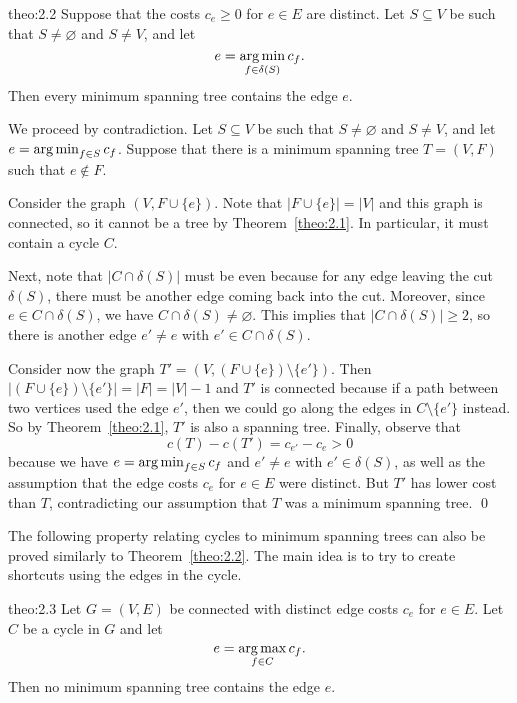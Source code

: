 \begin{theo}{theo:2.2}
    Suppose that the costs $c_e \geq 0$ for $e \in E$ are distinct. 
    Let $S \subseteq V$ be such that $S \neq \varnothing$ and $S \neq V$, 
    and let 
    \[ e = \operatorname*{arg\,min}_{f \in \delta(S)} c_f. \] 
    Then every minimum spanning tree contains the edge $e$. 
\end{theo}
\begin{pf}
    We proceed by contradiction. Let $S \subseteq V$ be such that $S 
    \neq \varnothing$ and $S \neq V$, and let $e = \operatorname*{arg\,min}_{f\in S} c_f$. 
    Suppose that there is a minimum spanning tree $T = (V, F)$ such that 
    $e \notin F$. 

    Consider the graph $(V, F \cup \{e\})$. Note that $|F \cup \{e\}| = |V|$ 
    and this graph is connected, so it cannot be a tree by Theorem~\ref{theo:2.1}. 
    In particular, it must contain a cycle $C$. 

    Next, note that $|C \cap \delta(S)|$ must be even because for any 
    edge leaving the cut $\delta(S)$, there must be another edge coming back 
    into the cut. Moreover, since $e \in C \cap \delta(S)$, we have 
    $C \cap \delta(S) \neq \varnothing$. This implies that 
    $|C \cap \delta(S)| \geq 2$, so there is another edge $e' \neq e$ 
    with $e' \in C \cap \delta(S)$.

    Consider now the graph $T' = (V, (F \cup \{e\}) \setminus \{e'\})$. 
    Then $|(F \cup \{e\}) \setminus \{e'\}| = |F| = |V| - 1$ and $T'$ is 
    connected because if a path between two vertices used the edge $e'$, 
    then we could go along the edges in $C \setminus \{e'\}$ instead. 
    So by Theorem~\ref{theo:2.1}, $T'$ is also a spanning tree. 
    Finally, observe that 
    \[ c(T) - c(T') = c_{e'} - c_e > 0 \] 
    because we have $e = \operatorname*{arg\,min}_{f\in S} c_f$ and $e' \neq e$ with 
    $e' \in \delta(S)$, as well as the assumption that the edge 
    costs $c_e$ for $e \in E$ were distinct. But $T'$ has lower cost 
    than $T$, contradicting our assumption that $T$ was a minimum 
    spanning tree. \qed
\end{pf}\vspace{-0.25cm}

The following property relating cycles to minimum spanning trees 
can also be proved similarly to Theorem~\ref{theo:2.2}. 
The main idea is to try to create shortcuts using the edges in the cycle. 

\begin{theo}{theo:2.3}
    Let $G = (V, E)$ be connected with distinct edge costs 
    $c_e$ for $e \in E$. Let $C$ be a cycle in $G$ and let 
    \[ e = \operatorname*{arg\,max}_{f\in C} c_f. \] 
    Then no minimum spanning tree contains the edge $e$. 
\end{theo}

